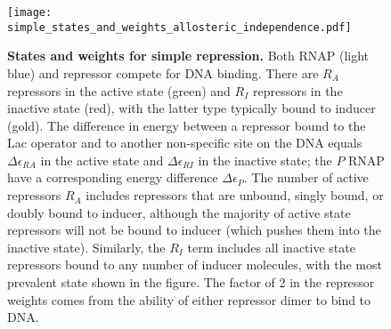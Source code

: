 \begin{figure}[h]
	\centering \texttt{[image: simple\_states\_and\_weights\_allosteric\_independence.pdf]}
	\caption{{\bf States and weights for simple repression. } Both RNAP (light blue)
		and repressor compete for DNA binding. There are $R_A$ repressors in the active
		state (green) and $R_I$ repressors in the inactive state (red), with the latter
		type typically bound to inducer (gold). The difference in energy between a
		repressor bound to the Lac operator and to another non-specific site on the DNA
		equals $\Delta\epsilon_{RA}$ in the active state and $\Delta\epsilon_{RI}$
		in the inactive state; the $P$ RNAP have a corresponding energy difference
		$\Delta\epsilon_{P}$. The number of active repressors $R_A$ includes
		repressors that are unbound, singly bound, or doubly bound to inducer, although
		the majority of active state repressors will not be bound to inducer (which
		pushes them into the inactive state). Similarly, the $R_I$ term includes all
		inactive state repressors bound to any number of inducer molecules, with the
		most prevalent state shown in the figure. The factor of 2 in the repressor
		weights comes from the ability of either repressor dimer to bind to DNA.}
	\label{figpolymeraseRepressorStates}
\end{figure}



